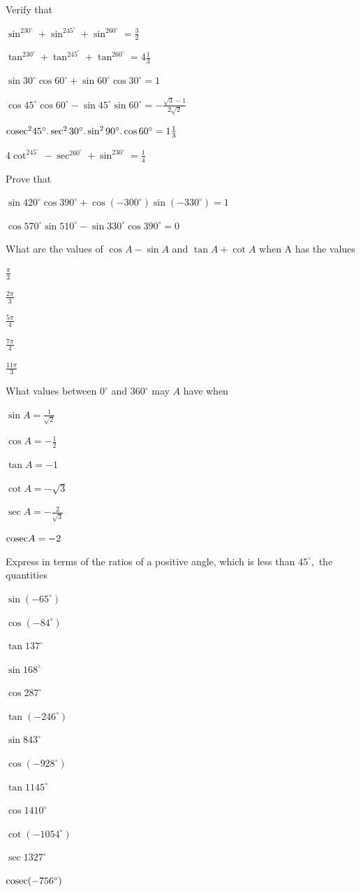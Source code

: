 Verify that

\item $\sin^230^\circ + \sin^245^\circ + \sin^260^\circ = \frac{3}{2}$
\item $\tan^230^\circ + \tan^245^\circ + \tan^260^\circ = 4\frac{1}{3}$
\item $\sin 30^\circ\cos 60^\circ + \sin 60^\circ\cos 30^\circ = 1$
\item $\cos 45^\circ\cos 60^\circ - \sin 45^\circ\sin 60^\circ = -\frac{\sqrt{3} - 1}{2\sqrt{2}}$
\item ${\rm cosec}^245^\circ.\sec^230^\circ.\sin^290^\circ.\cos 60^\circ = 1\frac{1}{3}$
\item $4\cot^245^\circ-\sec^260^\circ + \sin^230^\circ = \frac{1}{4}$
\stopitemize

Prove that
\item $\sin 420^\circ\cos 390^\circ + \cos(-300^\circ)\sin(-330^\circ) = 1$
\item $\cos 570^\circ\sin 510^\circ -\sin 330^\circ\cos 390^\circ = 0$
\stopitemize

What are the values of $\cos A - \sin A$ and $\tan A + \cot A$ when A has the values
\item $\frac{\pi}{3}$
\item $\frac{2\pi}{3}$
\item $\frac{5\pi}{4}$
\item $\frac{7\pi}{4}$
\item $\frac{11\pi}{3}$
\stopitemize

What values between $0^\circ$ and $360^\circ$ may $A$ have when
\item $\sin A = \frac{1}{\sqrt{2}}$
\item $\cos A = -\frac{1}{2}$
\item $\tan A = -1$
\item $\cot A = -\sqrt{3}$
\item $\sec A = -\frac{2}{\sqrt{3}}$
\item ${\rm cosec}A = -2$
\stopitemize

Express in terms of the ratios of a positive angle, which is less than $45^\circ,$ the quantities
\item $\sin(-65^\circ)$
\item $\cos(-84^\circ)$
\item $\tan 137^\circ$
\item $\sin 168^\circ$
\item $\cos 287^\circ$
\item $\tan(-246^\circ)$
\item $\sin 843^\circ$
\item $\cos(-928^\circ)$
\item $\tan 1145^\circ$
\item $\cos 1410^\circ$
\item $\cot(-1054^\circ)$
\item $\sec 1327^\circ$
\item ${\rm cosec}(-756^\circ)$
\stopitemize

